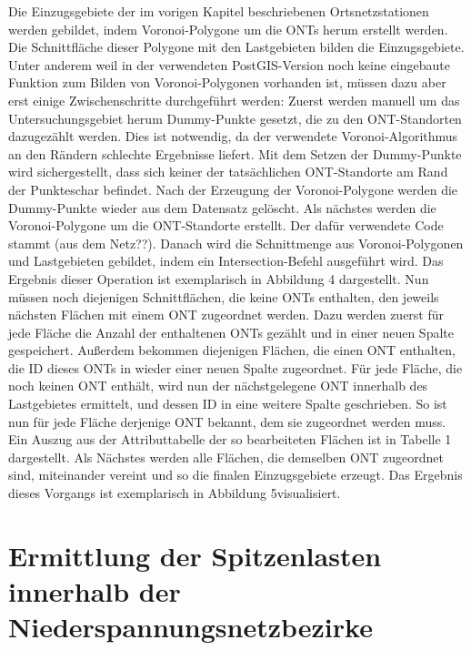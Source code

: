 \documentclass[11pt]{scrreprt}
\begin{document}
Die Einzugsgebiete der im vorigen Kapitel beschriebenen Ortsnetzstationen werden gebildet, indem Voronoi-Polygone um die ONTs herum erstellt werden. Die Schnittfläche dieser Polygone mit den Lastgebieten bilden die Einzugsgebiete. Unter anderem weil in der verwendeten PostGIS-Version noch keine eingebaute Funktion zum Bilden von Voronoi-Polygonen vorhanden ist, müssen dazu aber erst einige Zwischenschritte durchgeführt werden:
Zuerst werden manuell um das Untersuchungsgebiet herum Dummy-Punkte gesetzt, die zu den ONT-Standorten dazugezählt werden. Dies ist notwendig, da der verwendete Voronoi-Algorithmus an den Rändern schlechte Ergebnisse liefert. Mit dem Setzen der Dummy-Punkte wird sichergestellt, dass sich keiner der tatsächlichen ONT-Standorte am Rand der Punkteschar befindet. Nach der Erzeugung der Voronoi-Polygone werden die Dummy-Punkte wieder aus dem Datensatz gelöscht.
Als nächstes werden die Voronoi-Polygone um die ONT-Standorte erstellt.  Der dafür verwendete Code stammt (aus dem Netz??).
Danach wird die Schnittmenge aus Voronoi-Polygonen und Lastgebieten gebildet, indem ein Intersection-Befehl ausgeführt wird. Das Ergebnis dieser Operation ist exemplarisch in Abbildung 4 dargestellt.
Nun müssen noch diejenigen Schnittflächen, die keine ONTs enthalten, den jeweils nächsten Flächen mit einem ONT zugeordnet werden. Dazu werden zuerst für jede Fläche die Anzahl der enthaltenen ONTs gezählt und in einer neuen Spalte gespeichert. Außerdem bekommen diejenigen Flächen, die einen  ONT enthalten, die ID dieses ONTs in wieder einer neuen Spalte zugeordnet. Für jede Fläche, die noch keinen ONT enthält, wird nun der nächstgelegene ONT innerhalb des Lastgebietes ermittelt, und dessen ID in eine weitere Spalte geschrieben. So ist nun für jede Fläche derjenige ONT bekannt, dem sie zugeordnet werden muss. Ein Auszug aus der Attributtabelle der so bearbeiteten Flächen ist in Tabelle 1 dargestellt.
Als Nächstes werden alle Flächen, die demselben ONT zugeordnet sind, miteinander vereint und so die finalen Einzugsgebiete erzeugt. Das Ergebnis dieses Vorgangs ist exemplarisch in Abbildung 5visualisiert.

\chapter{Ermittlung der Spitzenlasten innerhalb der Niederspannungsnetzbezirke}
\label{sec:Ermittlung der Spitzenlasten innerhalb der Niederspannungsnetzbezirke}
\end{document}
